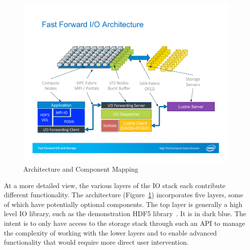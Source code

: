 \documentclass{sig-alt-gov2}
\begin{document}


\begin{figure}[htbp]
\vspace{-0.10in}
\centering
\includegraphics[width=\columnwidth]{images/arch-mapping}
\vspace{-0.20in}
\caption{Architecture and Component Mapping}
\label{fig:arch-mapping}
\vspace{-0.15in}
\end{figure}

At a more detailed view, the various layers of the IO stack each contribute
different functionality.  The architecture (Figure~\ref{fig:arch-mapping})
incorporates five layers, some of which have potentially optional components.
The top layer is generally a high level IO library, such as the demonstration
HDF5 library~\cite{hdf5}. It is in dark blue. The intent is to only have
access to the storage stack through such an API to manage the complexity of
working with the lower layers and to enable advanced functionality that would
require more direct user intervention.
\end{document}

